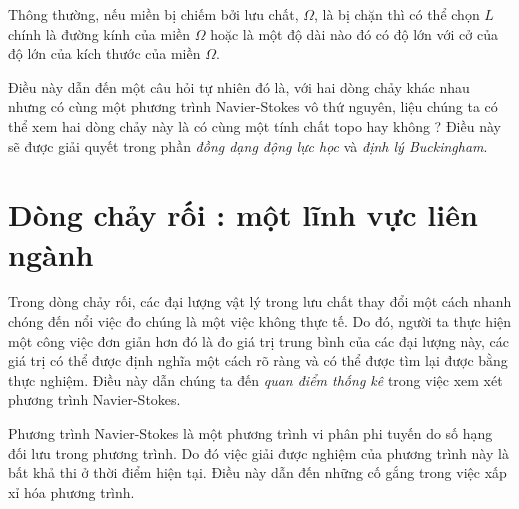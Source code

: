 \documentclass[CO_LUU_CHAT_NANG_CAO.tex]{subfiles}
\begin{document}
Thông thường, nếu miền bị chiếm bởi lưu chất, $\Omega$, là bị chặn thì có thể chọn $L$ chính là đường kính của miền $\Omega$ hoặc là một độ dài nào đó có độ lớn với cở của độ lớn của kích thước của miền $\Omega$.

Điều này dẫn đến một câu hỏi tự nhiên đó là, với hai dòng chảy khác nhau nhưng có cùng một phương trình Navier-Stokes vô thứ nguyên, liệu chúng ta có thể xem hai dòng chảy này là có cùng một tính chất topo hay không ? Điều này sẽ được giải quyết trong phần \emph{đồng dạng động lực học} và \emph{định lý Buckingham}.

\section{Dòng chảy rối : một lĩnh vực liên ngành}
Trong dòng chảy rối, các đại lượng vật lý trong lưu chất thay đổi một cách nhanh chóng đến nổi việc đo chúng là một việc không thực tế. Do đó, người ta thực hiện một công việc đơn giản hơn đó là đo giá trị trung bình của các đại lượng này, các giá trị có thể được định nghĩa một cách rõ ràng và có thể được tìm lại được bằng thực nghiệm. Điều này dẫn chúng ta đến \emph{quan điểm thống kê} trong việc xem xét phương trình Navier-Stokes.

Phương trình Navier-Stokes là một phương trình vi phân phi tuyến do số hạng đối lưu trong phương trình. Do đó việc giải được nghiệm của phương trình này là bất khả thi ở thời điểm hiện tại. Điều này dẫn đến những cố gắng trong việc xấp xỉ hóa phương trình. 
\end{document}
